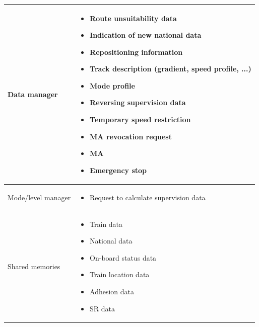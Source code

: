 \documentclass[nocc]{template/openetcs_report}
\begin{document}
\begin{longtable}{|l|l|}
				\hline	
									
					\begin{minipage}[t]{0.35\linewidth} Data manager	\end{minipage} 
				&	\begin{minipage}[t]{0.65\linewidth}
						\begin{itemize}
							\item Route unsuitability data
							\item Indication of new national data
							\item Repositioning information
							\item Track description (gradient, speed profile, ...)
							\item Mode profile
							\item Reversing supervision data
							\item Temporary speed restriction
							\item MA revocation request
							\item MA
							\item Emergency stop
						\end{itemize}			
					\end{minipage} \\
				
				\hline	
													
					\begin{minipage}[t]{0.35\linewidth} Mode/level manager	\end{minipage} 
				&	\begin{minipage}[t]{0.65\linewidth}
						\begin{itemize}
							\item Request to calculate supervision data
						\end{itemize}			
					\end{minipage} \\
				
				\hline														
				
					\begin{minipage}[t]{0.35\linewidth} Shared memories	\end{minipage} 
				&	\begin{minipage}[t]{0.65\linewidth}
						\begin{itemize}
							\item Train data
							\item National data
							\item On-board status data
							\item Train location data
							\item Adhesion data
							\item SR data						
						\end{itemize}				
					\end{minipage} \\
				
				\hline	
			\end{longtable}	
\end{document}
